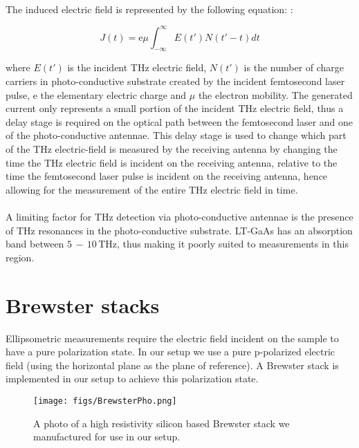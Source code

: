 \paragraph{}
The induced electric field is represented by the following equation: \cite{Sakai-2005}:

\begin{equation}
J(t) = \text{e}\mu\int^{\infty}_{-\infty}E(t')N(t'-t)dt
\label{eq:DetectCur}
\end{equation}

where $E(t')$ is the incident THz electric field, $N(t')$ is the number of charge carriers in photo-conductive substrate created by the incident femtosecond laser pulse, e the elementary electric charge and $\mu$ the electron mobility. The generated current only represents a small portion of the incident THz electric field, thus a delay stage is required on the optical path between the femtosecond laser and one of the photo-conductive antennae. 
This delay stage is used to change which part of the THz electric-field is measured by the receiving antenna by changing the time the THz electric field is incident on the receiving antenna, relative to the time the femtosecond laser pulse is incident on the receiving antenna, hence allowing for the measurement of the entire THz electric field in time.
\paragraph{}
A limiting factor for THz detection via photo-conductive antennae is the presence of THz resonances in the photo-conductive substrate. LT-GaAs has an absorption band between $5\,-\,10\,$THz, thus making it poorly suited to measurements in this region.

\section{Brewster stacks}
\label{sec: Brew}
Ellipsometric measurements require the electric field incident on the sample to have a pure polarization state.
In our setup we use a pure p-polarized electric field (using the horizontal plane as the plane of reference). A Brewster stack is implemented in our setup to achieve this polarization state. 

\begin{figure}[H]
\begin{center}
	 \texttt{[image: figs/BrewsterPho.png]}
	 \caption{A photo of a high resistivity silicon based Brewster stack we manufactured for use in our setup.}
   \label{fig:BrewPho}
\end{center}
\end{figure}

